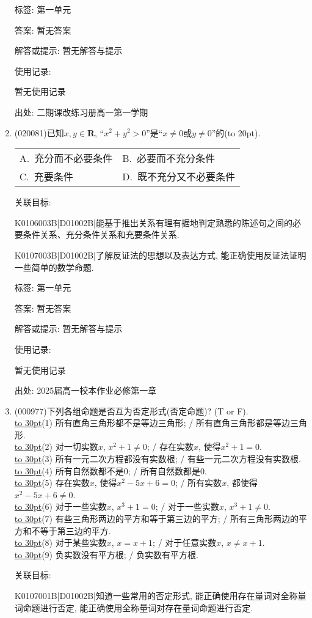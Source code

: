 \documentclass[10pt,a4paper]{article}
\newcommand{\blank}[1]{\underline{\hbox to #1pt{}}}
\newcommand{\bracket}[1]{(\hbox to #1pt{})}
\newcommand{\twoch}[4]{\par\begin{tabular}{p{.46\textwidth}p{.46\textwidth}}
A.~#1& B.~#2\\
C.~#3& D.~#4
\end{tabular}}
\begin{document}
\begin{enumerate}[1.]
标签: 第一单元

答案: 暂无答案

解答或提示: 暂无解答与提示

使用记录:

暂无使用记录


出处: 二期课改练习册高一第一学期
\item { (020081)}已知$x,y\in \mathbf{R}$, ``$x^2+y^2>0$''是``$x\ne 0$或$y\ne 0$''的\bracket{20}.
\twoch{充分而不必要条件}{必要而不充分条件}{充要条件}{既不充分又不必要条件}


关联目标:

K0106003B|D01002B|能基于推出关系有理有据地判定熟悉的陈述句之间的必要条件关系、充分条件关系和充要条件关系.

K0107003B|D01002B|了解反证法的思想以及表达方式, 能正确使用反证法证明一些简单的数学命题.



标签: 第一单元

答案: 暂无答案

解答或提示: 暂无解答与提示

使用记录:

暂无使用记录


出处: 2025届高一校本作业必修第一章
\item { (000977)}下列各组命题是否互为否定形式(否定命题)? (T or F).\\ 
\blank{30}(1) 所有直角三角形都不是等边三角形; / 所有直角三角形都是等边三角形.\\ 
\blank{30}(2) 对一切实数$x$, $x^2+1 \ne 0$; / 存在实数$x$, 使得$x^2+1=0$.\\ 
\blank{30}(3) 所有一元二次方程都没有实数根; / 有些一元二次方程没有实数根.\\ 
\blank{30}(4) 所有自然数都不是$0$; / 所有自然数都是$0$.\\ 
\blank{30}(5) 存在实数$x$, 使得$x^2-5x+6=0$; / 所有实数$x$, 都使得$x^2-5x+6\ne 0$.\\ 
\blank{30}(6) 对于一些实数$x$, $x^3+1=0$; / 对于一些实数$x$, $x^3+1\ne 0$.\\ 
\blank{30}(7) 有些三角形两边的平方和等于第三边的平方; / 所有三角形两边的平方和不等于第三边的平方.\\ 
\blank{30}(8) 对于某些实数$x$, $x=x+1$; / 对于任意实数$x$, $x \ne x+1$.\\ 
\blank{30}(9) 负实数没有平方根; / 负实数有平方根.


关联目标:

K0107001B|D01002B|知道一些常用的否定形式, 能正确使用存在量词对全称量词命题进行否定, 能正确使用全称量词对存在量词命题进行否定.




\end{enumerate}
\end{document}
